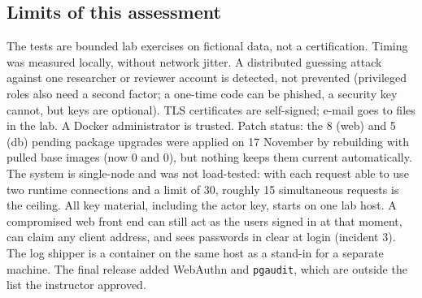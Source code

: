 \documentclass[10pt,a4paper]{article}
\newcommand{\code}[1]{\nolinkurl{#1}}
\begin{document}
\subsection{Limits of this assessment}
The tests are bounded lab exercises on fictional data, not a certification. Timing was measured locally, without network jitter. A distributed guessing attack against one researcher or reviewer account is detected, not prevented (privileged roles also need a second factor; a one-time code can be phished, a security key cannot, but keys are optional). TLS certificates are self-signed; e-mail goes to files in the lab. A Docker administrator is trusted. Patch status: the 8 (web) and 5 (db) pending package upgrades were applied on 17 November by rebuilding with pulled base images (now 0 and 0), but nothing keeps them current automatically. The system is single-node and was not load-tested: with each request able to use two runtime connections and a limit of 30, roughly 15 simultaneous requests is the ceiling. All key material, including the actor key, starts on one lab host. A compromised web front end can still act as the users signed in at that moment, can claim any client address, and sees passwords in clear at login (incident 3). The log shipper is a container on the same host as a stand-in for a separate machine. The final release added WebAuthn and \code{pgaudit}, which are outside the list the instructor approved.

\end{document}
